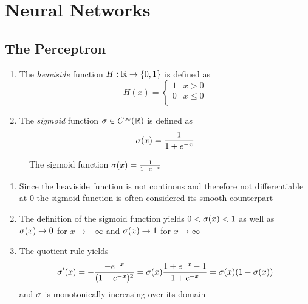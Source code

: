 \newpage
\section{Neural Networks}

\subsection{The Perceptron}

\begin{definition}\hfill
    \begin{enumerate}
		\item The \emph{heaviside} function \( H: \mathbb{R} \to \{ 0, 1 \} \) is defined as
			\[
				H(x) = \left\{
					\begin{array}{ll}
						1 & x > 0 \\
						0 & x \le 0 \\
					\end{array} 
				\right.
			\]
		\item The \emph{sigmoid} function \( \sigma \in C^\infty(\mathbb{R}) \) is defined as 
			\[
				\sigma(x) = \frac{1}{1 + e^{-x}}
			\]
    \end{enumerate}
\end{definition}
\bigskip


\begin{figure}[H]
	\centering
	\plotsigmoid
	\caption{The sigmoid function $ \sigma(x) = \frac{1}{1 + e^{-x}} $}\label{fig:sigmoid}
\end{figure}
\bigskip


\begin{remarks}\hfill
    \begin{enumerate}
		\item Since the heaviside function is not continous and therefore not differentiable at \( 0 \)
			the sigmoid function is often considered its smooth counterpart
		\item The definition of the sigmoid function yields \( 0 < \sigma(x) <  1 \) as well as 
			\( \sigma(x) \to 0 \) for \( x \to -\infty \) and \( \sigma(x) \to 1 \) for \( x \to \infty \)
		\item The quotient rule yields
			\[
				\sigma'(x) 
					= -\frac{-e^{-x}}{(1 + e^{-x})^2}
					= \sigma(x) \frac{1 + e^{-x} - 1}{1 + e^{-x}}
					= \sigma(x)(1 - \sigma(x))
			\]
			and \( \sigma \) is monotonically increasing over its domain
    \end{enumerate}
\end{remarks}
\bigskip


